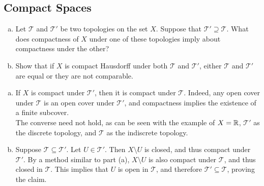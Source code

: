 \subsection{Compact Spaces}

	\begin{exercise}
	\phantom{bah}
		\begin{enumerate}[(a)]
			\item Let $\mathcal{T}$ and $\mathcal{T}'$ be two topologies on the set $X$. Suppose that $\mathcal{T}'\supseteq\mathcal{T}$. What does compactness of $X$ under one of these topologies imply about compactness under the other?
			\item Show that if $X$ is compact Hausdorff under both $\mathcal{T}$ and $\mathcal{T}'$, either $\mathcal{T}$ and $\mathcal{T}'$ are equal or they are not comparable.
		\end{enumerate}
	\end{exercise}
	\begin{solution*}
		\begin{enumerate}[(a)]
			\item If $X$ is compact under $\mathcal{T}'$, then it is compact under $\mathcal{T}$. Indeed, any open cover under $\mathcal{T}$ is an open cover under $\mathcal{T}'$, and compactness implies the existence of a finite subcover.\\
			The converse need not hold, as can be seen with the example of $X=\mathbb{R}$, $\mathcal{T}'$ as the discrete topology, and $\mathcal{T}$ as the indiscrete topology.
			\item Suppose $\mathcal{T}\subseteq\mathcal{T}'$. Let $U\in\mathcal{T}'$. Then $X\setminus U$ is closed, and thus compact under $\mathcal{T}'$. By a method similar to part (a), $X\setminus U$ is also compact under $\mathcal{T}$, and thus closed in $\mathcal{T}$. This implies that $U$ is open in $\mathcal{T}$, and therefore $\mathcal{T}'\subseteq\mathcal{T}$, proving the claim.
		\end{enumerate}
	\end{solution*}

